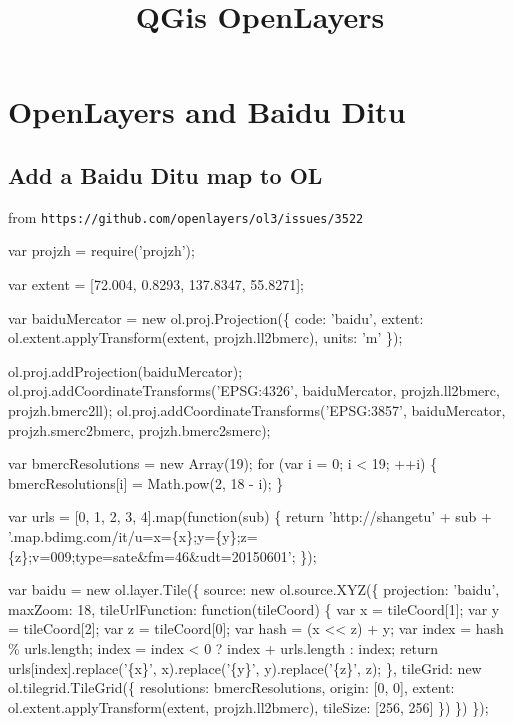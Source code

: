 


\title{QGis OpenLayers\bigskip
}
\author{}
\date{}


\maketitle

\justify



\section*{OpenLayers and Baidu Ditu}

\subsection*{Add a Baidu Ditu map to OL}

from \texttt{https://github.com/openlayers/ol3/issues/3522}

\bigskip

var projzh = require('projzh');

var extent = [72.004, 0.8293, 137.8347, 55.8271];

var baiduMercator = new ol.proj.Projection(\{
  code: 'baidu',
  extent: ol.extent.applyTransform(extent, projzh.ll2bmerc),
  units: 'm'
\});

ol.proj.addProjection(baiduMercator);
ol.proj.addCoordinateTransforms('EPSG:4326', baiduMercator, projzh.ll2bmerc, projzh.bmerc2ll);
ol.proj.addCoordinateTransforms('EPSG:3857', baiduMercator, projzh.smerc2bmerc, projzh.bmerc2smerc);

var bmercResolutions = new Array(19);
for (var i = 0; i < 19; ++i) \{
  bmercResolutions[i] = Math.pow(2, 18 - i);
\}

var urls = [0, 1, 2, 3, 4].map(function(sub) \{
  return 'http://shangetu' + sub +
      '.map.bdimg.com/it/u=x=\{x\};y=\{y\};z=\{z\};v=009;type=sate{\&}fm=46{\&}udt=20150601';
\});

var baidu = new ol.layer.Tile(\{
  source: new ol.source.XYZ(\{
    projection: 'baidu',
    maxZoom: 18,
    tileUrlFunction: function(tileCoord) \{
      var x = tileCoord[1];
      var y = tileCoord[2];
      var z = tileCoord[0];
      var hash = (x << z) + y;
      var index = hash \% urls.length;
      index = index < 0 ? index + urls.length : index;
      return urls[index].replace('\{x\}', x).replace('\{y\}', y).replace('\{z\}', z);
    \},
    tileGrid: new ol.tilegrid.TileGrid(\{
      resolutions: bmercResolutions,
      origin: [0, 0],
      extent: ol.extent.applyTransform(extent, projzh.ll2bmerc),
      tileSize: [256, 256]
    \})
  \})
\});



